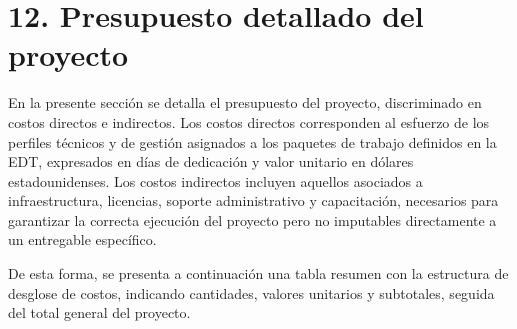 \documentclass[12pt]
{charter}
\begin{document}


\section{12. Presupuesto detallado del proyecto}
\label{sec:presupuesto}

En la presente sección se detalla el presupuesto del proyecto, discriminado en costos directos e indirectos. 
Los costos directos corresponden al esfuerzo de los perfiles técnicos y de gestión asignados a los paquetes de trabajo definidos en la EDT, expresados en días de dedicación y valor unitario en dólares estadounidenses. Los costos indirectos incluyen aquellos asociados a infraestructura, licencias, soporte administrativo y capacitación, necesarios para garantizar la correcta ejecución del proyecto pero no imputables directamente a un entregable específico. 

De esta forma, se presenta a continuación una tabla resumen con la estructura de desglose de costos, 
indicando cantidades, valores unitarios y subtotales, seguida del total general del proyecto.
\end{document}
